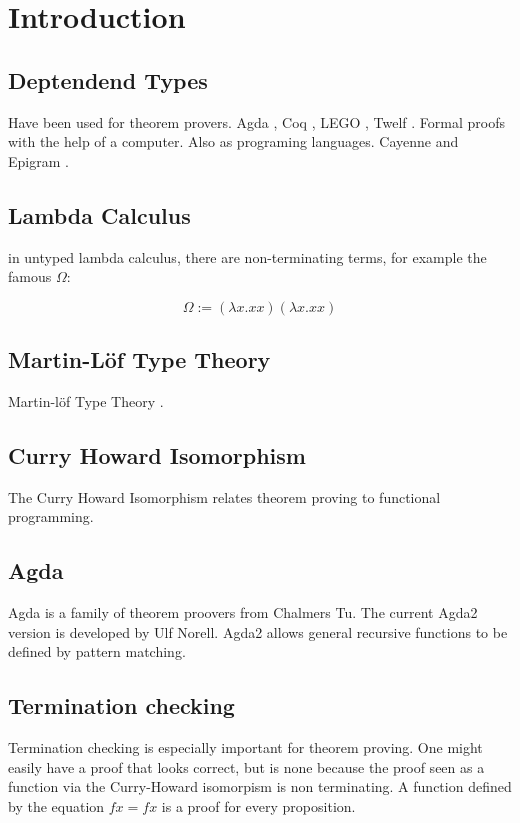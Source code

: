 \chapter{Introduction}
\section {Deptendend Types}
Have been used for theorem provers.
Agda \cite{norell:thesis}, Coq \cite{coq} , LEGO \cite{pollack94theory} , Twelf \cite{pfenning99system}.
Formal proofs with the help of a computer.
Also as programing languages. Cayenne \cite{augustsson98cayenne} and Epigram \cite{epigram}. 
\section{Lambda Calculus}

in untyped lambda calculus, there are non-terminating terms, for example the famous \( \Omega \):

\[ \Omega := (\lambda x . x x) (\lambda x . x x) \]


\section{Martin-L\"of Type Theory}
Martin-l\"of Type Theory \cite{mart84}.
\section {Curry Howard Isomorphism}
The Curry Howard Isomorphism relates theorem proving to functional programming.
\section{Agda}

Agda is a family of theorem proovers from Chalmers Tu.
The current Agda2 version is developed by Ulf Norell.
Agda2 allows general recursive functions to be defined by pattern matching.

\section {Termination checking}
Termination checking is especially important for theorem proving.
One might easily have a proof that looks correct, but is none because the proof seen as a function
via the Curry-Howard isomorpism is non terminating.
A function defined by the equation $ f x = f x $ is a proof for every proposition.

